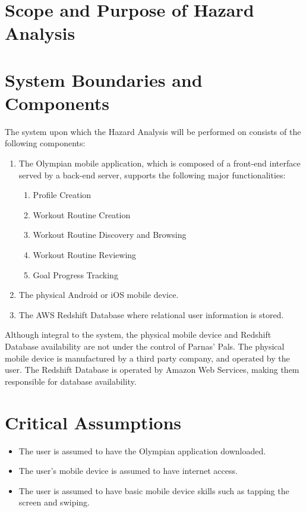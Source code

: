 \documentclass{article}
\begin{document}
	\section{Scope and Purpose of Hazard Analysis}
	
	\section{System Boundaries and Components}

	The system upon which the Hazard Analysis will be performed on consists of the following components:

	\begin{enumerate}
		\item The Olympian mobile application, which is composed of a front-end interface served by a back-end server, supports the following major functionalities: 
		\begin{enumerate}
			\item Profile Creation
			\item Workout Routine Creation
			\item Workout Routine Discovery and Browsing
			\item Workout Routine Reviewing
			\item Goal Progress Tracking
		\end{enumerate}

		\item The physical Android or iOS mobile device.

		\item The AWS Redshift Database where relational user information is stored.

	\end{enumerate}
	Although integral to the system, the physical mobile device and Redshift Database availability are not under the control of Parnas' Pals.
    The physical mobile device is manufactured by a third party company, and operated by the user. 
	The Redshift Database is operated by Amazon Web Services, making them responsible for database availability.
	
	\section{Critical Assumptions}

	\begin{itemize}

	\item The user is assumed to have the Olympian application downloaded.

	\item The user's mobile device is assumed to have internet access.

	\item The user is assumed to have basic mobile device skills such as tapping the screen and swiping.
		
	\end{itemize}
\end{document}
